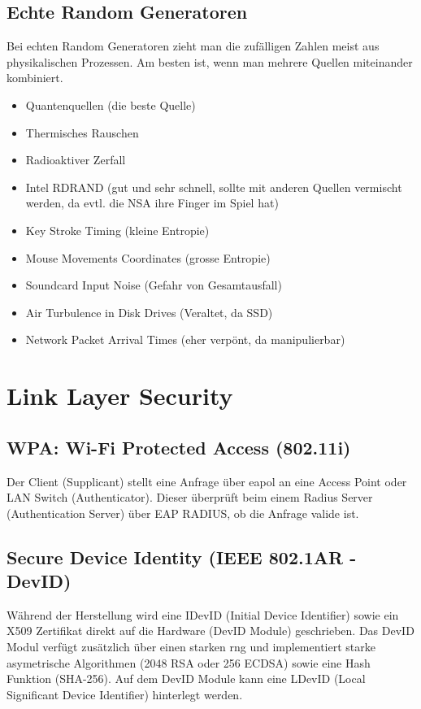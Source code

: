 \subsection{Echte Random Generatoren}
Bei echten Random Generatoren zieht man die zufälligen Zahlen meist aus physikalischen Prozessen. Am besten ist, wenn man mehrere Quellen miteinander kombiniert.
\begin{itemize}
	\item Quantenquellen (die beste Quelle)
	\item Thermisches Rauschen 
	\item Radioaktiver Zerfall
	\item Intel RDRAND (gut und sehr schnell, sollte mit anderen Quellen vermischt werden, da evtl. die NSA ihre Finger im Spiel hat)
	\item Key Stroke Timing (kleine Entropie)
	\item Mouse Movements Coordinates (grosse Entropie)
	\item Soundcard Input Noise (Gefahr von Gesamtausfall)
	\item Air Turbulence in Disk Drives (Veraltet, da SSD)
	\item Network Packet Arrival Times (eher verpönt, da manipulierbar)
\end{itemize}


\section{Link Layer Security}

\subsection{WPA: Wi-Fi Protected Access (802.11i)}
Der Client (Supplicant) stellt eine Anfrage über \gls{eapol} an eine Access Point oder LAN Switch (Authenticator). Dieser überprüft beim einem Radius Server (Authentication Server) über EAP RADIUS, ob die Anfrage valide ist.

\subsection{Secure Device Identity (IEEE 802.1AR - DevID)}
Während der Herstellung wird eine IDevID (Initial Device Identifier) sowie ein X509 Zertifikat direkt auf die Hardware (DevID Module) geschrieben. Das DevID Modul verfügt zusätzlich über einen starken \gls{rng}  und implementiert starke asymetrische Algorithmen (2048 RSA oder 256 ECDSA) sowie eine Hash Funktion (SHA-256). Auf dem DevID Module kann eine LDevID (Local Significant Device Identifier) hinterlegt werden.

